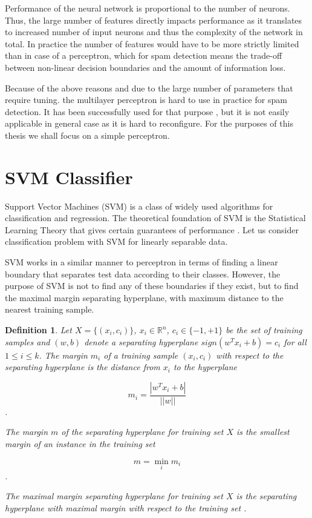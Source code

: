 \documentclass[12pt]{report}
\newcommand{\re}{\mathbb{R}}
\newtheorem{definition}{Definition}[section]
\begin{document}
Performance of the neural network is proportional to the number of neurons. Thus, the large number of features directly impacts performance as it translates to increased number of input neurons and thus the complexity of the network in total. In practice the number of features would have to be more strictly limited than in case of a perceptron, which for spam detection means the trade-off between non-linear decision boundaries and the amount of information loss.

Because of the above reasons and due to the large number of parameters that require tuning. the multilayer perceptron is hard to use in practice for spam detection. It has been successfully used for that purpose \cite{Tretyakov}, but it is not easily applicable in general case as it is hard to reconfigure. For the purposes of this thesis we shall focus on a simple perceptron.

\newpage

\section{SVM Classifier}

Support Vector Machines (SVM) is a class of widely used algorithms for classification and regression. The theoretical foundation of SVM is the Statistical Learning Theory that gives certain guarantees of performance \cite{Cristianini}. Let us consider classification problem with SVM for linearly separable data.

SVM works in a similar manner to perceptron in terms of finding a linear boundary that separates test data according to their classes. However, the purpose of SVM is not to find any of these boundaries if they exist, but to find the maximal margin separating hyperplane, with maximum distance to the nearest training sample.

\begin{definition}
	Let $X = \{(x_i, c_i)\}$, $x_i \in \re^n$, $c_i \in \{-1, +1\}$ be the set of training samples and $(w, b)$ denote a separating hyperplane $sign(w^T x_i + b) = c_i$ for all $1 \leq i \leq k$. The margin $m_i$ of a training sample $(x_i, c_i)$ with respect to the separating hyperplane is the distance from $x_i$ to the hyperplane
	
	$$m_i = \dfrac{|w^T x_i + b|}{||w||}$$.
	
	The margin $m$ of the separating hyperplane for training set $X$ is the smallest margin of an instance in the training set
	
	$$m = \min_i m_i$$.
	
	The maximal margin separating hyperplane for training set $X$ is the separating hyperplane with maximal margin with respect to the training set \cite{Tretyakov}.
\end{definition}
\end{document}
